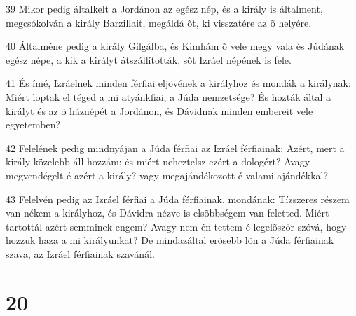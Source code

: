 \par 39 Mikor pedig általkelt a Jordánon az egész nép, és a király is általment, megcsókolván a király Barzillait, megáldá õt, ki visszatére az õ helyére.
\par 40 Általméne pedig a király Gilgálba, és Kimhám õ vele megy vala és Júdának egész népe, a kik a királyt átszállították, sõt Izráel népének is fele.
\par 41 És ímé, Izráelnek minden férfiai eljövének a királyhoz és mondák a királynak: Miért loptak el téged a mi atyánkfiai, a Júda nemzetsége? És hozták által a királyt és az õ háznépét a Jordánon, és Dávidnak minden embereit vele egyetemben?
\par 42 Felelének pedig mindnyájan a Júda férfiai az Izráel férfiainak: Azért, mert a király közelebb áll hozzám; és miért neheztelsz ezért a dologért? Avagy megvendégelt-é azért a király? vagy megajándékozott-é valami ajándékkal?
\par 43 Felelvén pedig az Izráel férfiai a Júda férfiainak, mondának: Tízszeres részem van nékem a királyhoz, és Dávidra nézve is elsõbbségem van feletted. Miért tartottál azért semminek engem? Avagy nem én tettem-é legelõször szóvá, hogy hozzuk haza a mi királyunkat? De mindazáltal erõsebb lõn a Júda férfiainak szava, az Izráel férfiainak szavánál.

\chapter{20}

